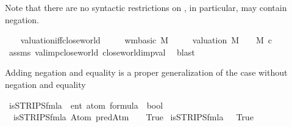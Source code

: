 \begin{isabellebody}
\begin{isamarkuptext}
    Note that there are no syntactic restrictions on \isa{{\isasymphi}},
    in particular, \isa{{\isasymphi}} may contain negation.%
\end{isamarkuptext}\isamarkuptrue%
\ \ \isamarkupfalse%
\ valuation{\isacharunderscore}{\kern0pt}iff{\isacharunderscore}{\kern0pt}close{\isacharunderscore}{\kern0pt}world{\isacharcolon}{\kern0pt}\isanewline
\ \ \ \ \ {\isachardoublequoteopen}wm{\isacharunderscore}{\kern0pt}basic\ M{\isachardoublequoteclose}\isanewline
\ \ \ \ \ {\isachardoublequoteopen}valuation\ M\ {\isasymTurnstile}\ {\isasymphi}\ {\isasymlongleftrightarrow}\ M\ \isactrlsup c{\isasymTTurnstile}\isactrlsub {\isacharequal}{\kern0pt}\ {\isasymphi}{\isachardoublequoteclose}\isanewline
%
\isadelimproof
\ \ \ \ %
\endisadelimproof
%
\isatagproof
{}\isamarkupfalse%
\ assms\ val{\isacharunderscore}{\kern0pt}imp{\isacharunderscore}{\kern0pt}close{\isacharunderscore}{\kern0pt}world\ close{\isacharunderscore}{\kern0pt}world{\isacharunderscore}{\kern0pt}imp{\isacharunderscore}{\kern0pt}val\ \isamarkupfalse%
\ blast%
\endisatagproof
{\isafoldproof}%
%
\isadelimproof
%
\endisadelimproof
%
\isadelimdocument
%
\endisadelimdocument
%
\isatagdocument
%
\isamarkuptrue%
%
\endisatagdocument
{\isafolddocument}%
%
\isadelimdocument
%
\endisadelimdocument
%
\begin{isamarkuptext}%
Adding negation and equality is a proper generalization of the
  case without negation and equality%
\end{isamarkuptext}\isamarkuptrue%
\isamarkupfalse%
\ is{\isacharunderscore}{\kern0pt}STRIPS{\isacharunderscore}{\kern0pt}fmla\ {\isacharcolon}{\kern0pt}{\isacharcolon}{\kern0pt}\ {\isachardoublequoteopen}{\isacharprime}{\kern0pt}ent\ atom\ formula\ {\isasymRightarrow}\ bool{\isachardoublequoteclose}\ \isanewline
\ \ {\isachardoublequoteopen}is{\isacharunderscore}{\kern0pt}STRIPS{\isacharunderscore}{\kern0pt}fmla\ {\isacharparenleft}{\kern0pt}Atom\ {\isacharparenleft}{\kern0pt}predAtm\ {\isacharunderscore}{\kern0pt}\ {\isacharunderscore}{\kern0pt}{\isacharparenright}{\kern0pt}{\isacharparenright}{\kern0pt}\ {\isasymlongleftrightarrow}\ True{\isachardoublequoteclose}\isanewline
{\isacharbar}{\kern0pt}\ {\isachardoublequoteopen}is{\isacharunderscore}{\kern0pt}STRIPS{\isacharunderscore}{\kern0pt}fmla\ {\isacharparenleft}{\kern0pt}{\isasymbottom}{\isacharparenright}{\kern0pt}\ {\isasymlongleftrightarrow}\ True{\isachardoublequoteclose}\isanewline

\end{isabellebody}
